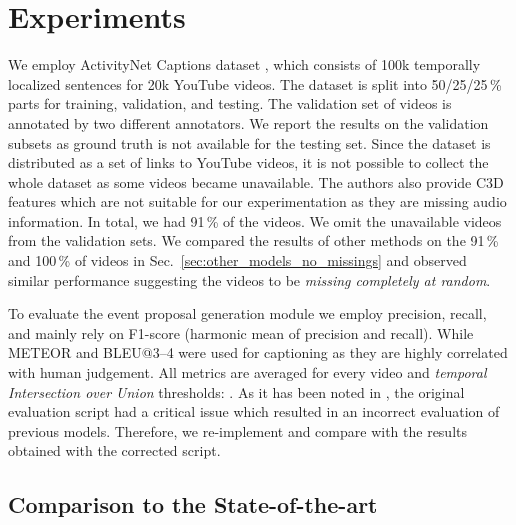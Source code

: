 \documentclass{src/bmvc2k}
\begin{document}
\section{Experiments}

\vspace{-1ex}We employ ActivityNet Captions dataset \cite{Krishna2017}, which consists of 100k temporally localized sentences for 20k YouTube videos. The dataset is split into 50/25/25\,\% parts for training, validation, and testing. The validation set of videos is annotated by two different annotators. We report the results on the validation subsets as ground truth is not available for the testing set. Since the dataset is distributed as a set of links to YouTube videos, it is not possible to collect the whole dataset as some videos became unavailable. The authors also provide C3D features which are not suitable for our experimentation as they are missing audio information. In total, we had 91\,\% of the videos. We omit the unavailable videos from the validation sets. We compared the results of other methods on the 91\,\% and 100\,\% of videos in Sec.~\ref{sec:other_models_no_missings} and observed similar performance suggesting the videos to be \textit{missing completely at random}.

To evaluate the event proposal generation module we employ precision, recall, and mainly rely on F1-score (harmonic mean of precision and recall). While METEOR \cite{METEOR_Denkowski2014} and BLEU@3--4 \cite{bleu_Papineni2002} were used for captioning as they are highly correlated with human judgement. All metrics are averaged for every video and \textit{temporal Intersection over Union} thresholds: . As it has been noted in \cite{Streamlined_Mun2019}, the original evaluation script had a critical issue which resulted in an incorrect evaluation of previous models. Therefore, we re-implement \cite{bafcg_Wang2018n,masked_transformer_Zhou2018} and compare with the results obtained with the corrected script.

\subsection{Comparison to the State-of-the-art}
\end{document}
